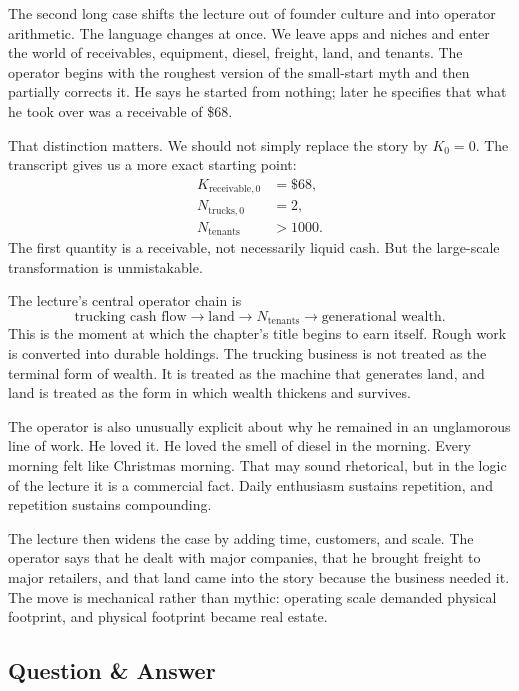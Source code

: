 The second long case shifts the lecture out of founder culture and into operator arithmetic. The language changes at once. We leave apps and niches and enter the world of receivables, equipment, diesel, freight, land, and tenants. The operator begins with the roughest version of the small-start myth and then partially corrects it. He says he started from nothing; later he specifies that what he took over was a receivable of \$68.

That distinction matters. We should not simply replace the story by \(K_0=0\). The transcript gives us a more exact starting point:
\begin{align}
K_{\text{receivable},0}&=\$68,\\
N_{\text{trucks},0}&=2,\\
N_{\text{tenants}}&>1000.
\end{align}
The first quantity is a receivable, not necessarily liquid cash. But the large-scale transformation is unmistakable.

The lecture's central operator chain is
\begin{equation}
\text{trucking cash flow}\to \text{land}\to N_{\text{tenants}}\to \text{generational wealth}.
\end{equation}
This is the moment at which the chapter's title begins to earn itself. Rough work is converted into durable holdings. The trucking business is not treated as the terminal form of wealth. It is treated as the machine that generates land, and land is treated as the form in which wealth thickens and survives.

The operator is also unusually explicit about why he remained in an unglamorous line of work. He loved it. He loved the smell of diesel in the morning. Every morning felt like Christmas morning. That may sound rhetorical, but in the logic of the lecture it is a commercial fact. Daily enthusiasm sustains repetition, and repetition sustains compounding.

The lecture then widens the case by adding time, customers, and scale. The operator says that he dealt with major companies, that he brought freight to major retailers, and that land came into the story because the business needed it. The move is mechanical rather than mythic: operating scale demanded physical footprint, and physical footprint became real estate.

\subsection{Question \& Answer}

